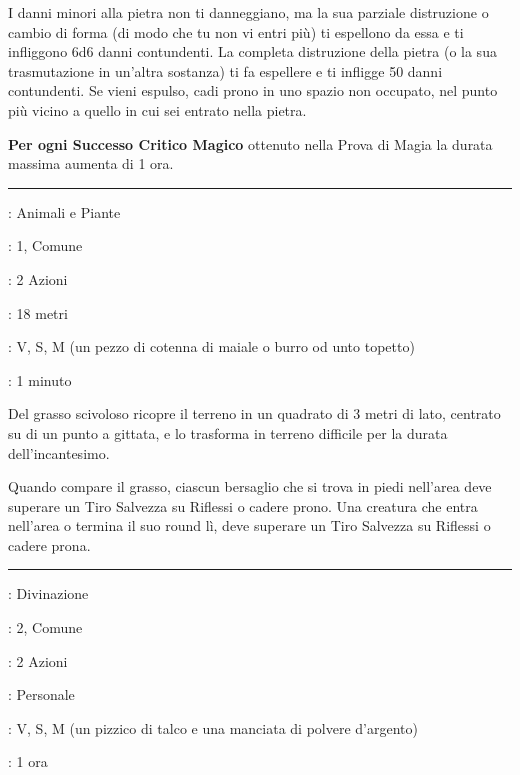\begin{multicols}{2}
I danni minori alla pietra non ti danneggiano, ma la sua parziale distruzione o cambio di forma (di modo che tu non vi entri più) ti espellono da essa e ti infliggono 6d6 danni contundenti. La completa distruzione della pietra (o la sua trasmutazione in un'altra sostanza) ti fa espellere e ti infligge 50 danni contundenti. Se vieni espulso, cadi prono in uno spazio non occupato, nel punto più vicino a quello in cui sei entrato nella pietra.

\textbf{Per ogni Successo Critico Magico} ottenuto nella Prova di Magia la durata massima aumenta di 1 ora.

\smallskip\noindent\rule{\linewidth}{2pt} \hypertarget{Unto}{}\medskip{}
\noindent
\begin{description}[noitemsep, topsep=0pt, parsep=0pt, partopsep=0pt, leftmargin=0cm, labelwidth=2.8cm]
	\item[\textbf{Lista di Magia}]: Animali e Piante
	\item[\textbf{Livello}]: 1, Comune
	\item[\textbf{T. di Lancio}]: 2 Azioni
	\item[\textbf{Gittata}]: 18 metri
	\item[\textbf{Componenti}]: V, S, M (un pezzo di cotenna di maiale o burro od unto topetto)
	\item[\textbf{Durata}]: 1 minuto
\end{description}

Del grasso scivoloso ricopre il terreno in un quadrato di 3 metri di lato, centrato su di un punto a gittata, e lo trasforma in terreno difficile per la durata dell'incantesimo.

Quando compare il grasso, ciascun bersaglio che si trova in piedi nell'area deve superare un Tiro Salvezza su Riflessi o cadere prono. Una creatura che entra nell'area o termina il suo round lì, deve superare un Tiro Salvezza su Riflessi o cadere prona.

\smallskip\noindent\rule{\linewidth}{2pt} \hypertarget{Vedere l'invisibile}{}\medskip{}
\noindent
\begin{description}[noitemsep, topsep=0pt, parsep=0pt, partopsep=0pt, leftmargin=0cm, labelwidth=2.8cm]
	\item[\textbf{Lista di Magia}]: Divinazione
	\item[\textbf{Livello}]: 2, Comune
	\item[\textbf{T. di Lancio}]: 2 Azioni
	\item[\textbf{Gittata}]: Personale
	\item[\textbf{Componenti}]: V, S, M (un pizzico di talco e una manciata di polvere d'argento)
	\item[\textbf{Durata}]: 1 ora
\end{description}


\end{multicols}
